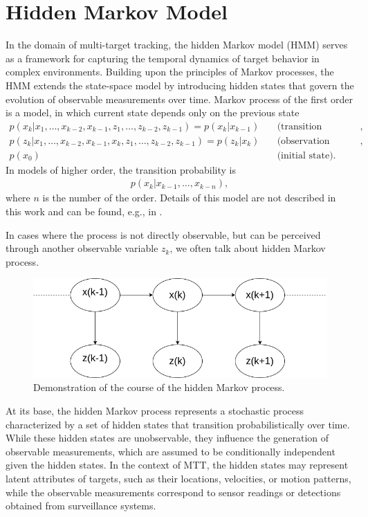     \section{Hidden Markov Model}
In the domain of multi-target tracking, the hidden Markov model (HMM) serves as a framework for
capturing the temporal dynamics of target behavior in complex environments. Building upon the principles of Markov
processes, the HMM extends the state-space model by introducing hidden states that govern the evolution of observable
measurements over time. Markov process of the first order is a model, in which current state depends only on the
previous state
\begin{align}
    p(x_k|x_1,\dots,x_{k-2},x_{k-1}, z_1, \dots, z_{k-2}, z_{k-1}) = p(x_k|x_{k-1}) &\quad \text{(transition
    probability)}, \\
    p(z_k|x_1,\dots,x_{k-2},x_{k-1}, x_k, z_1, \dots, z_{k-2}, z_{k-1}) = p(z_k|x_{k}) &\quad \text{(observation
    likelihood)}, \\
    p(x_0)& \quad \text{(initial state)}.
\end{align}
In models of higher order, the transition probability is
\begin{align}
    p(x_k|x_{k-1},\dots,x_{k-n}),
\end{align}
where $n$ is the number of the order. Details of this model are not described in this work and can be found, e.g.,
in \cite{
    HadarHMMHigherOrder}.

In cases where the process is not directly observable, but can be perceived through another observable variable $z_k$,
we often talk about hidden Markov process.
\begin{figure}[h]
    \centering
    \includegraphics[width=0.8\linewidth]{./text/chapter_01/imgs/HMM}
    \caption{Demonstration of the course of the hidden Markov process.}
    \label{fig:hmm}
\end{figure}

At its base, the hidden Markov process represents a stochastic process characterized by a set of hidden states that
transition probabilistically over time. While these hidden states are unobservable, they influence the generation of observable measurements, which are assumed to be conditionally independent given the hidden states. In the context of MTT, the hidden states may represent latent attributes of targets, such as their locations, velocities, or motion patterns, while the observable measurements correspond to sensor readings or detections obtained from surveillance systems.

